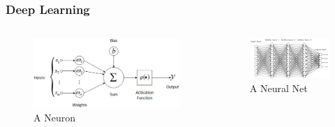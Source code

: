 \documentclass{beamer}
\begin{document}
\begin{frame}
\frametitle{Deep Learning}
\begin{columns}
\begin{figure}[htp]
    \centering
    \includegraphics[scale=0.1]{images/neuron.jpeg}
    \caption{A Neuron}
\end{figure}
\begin{figure}[htp]
    \centering
    \includegraphics[scale=0.3]{images/neural_net.png}
    \caption{A Neural Net}
\end{figure}
\end{columns}
\end{frame}
\end{document}

